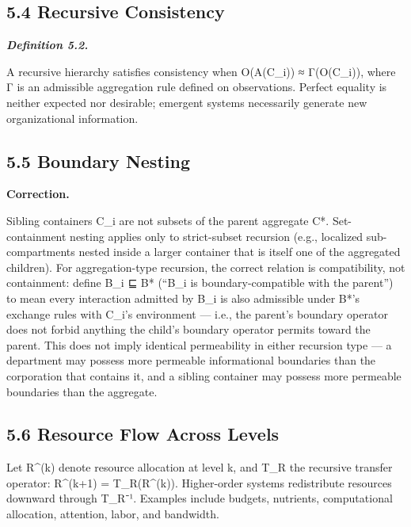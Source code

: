 \documentclass[
]{article}
\begin{document}
\hypertarget{recursive-consistency}{%
\subsection{5.4 Recursive Consistency}\label{recursive-consistency}}

\emph{\textbf{Definition 5.2.}}

A recursive hierarchy satisfies consistency when O(A(C\_i)) ≈
Γ(O(C\_i)), where Γ is an admissible aggregation rule defined on
observations. Perfect equality is neither expected nor desirable;
emergent systems necessarily generate new organizational information.

\hypertarget{boundary-nesting}{%
\subsection{5.5 Boundary Nesting}\label{boundary-nesting}}

\textbf{Correction.}

Sibling containers C\_i are not subsets of the parent aggregate C*.
Set-containment nesting applies only to strict-subset recursion (e.g.,
localized sub-compartments nested inside a larger container that is
itself one of the aggregated children). For aggregation-type recursion,
the correct relation is compatibility, not containment: define B\_i ⊑ B*
(``B\_i is boundary-compatible with the parent'') to mean every
interaction admitted by B\_i is also admissible under B*'s exchange
rules with C\_i's environment --- i.e., the parent's boundary operator
does not forbid anything the child's boundary operator permits toward
the parent. This does not imply identical permeability in either
recursion type --- a department may possess more permeable informational
boundaries than the corporation that contains it, and a sibling
container may possess more permeable boundaries than the aggregate.

\hypertarget{resource-flow-across-levels}{%
\subsection{5.6 Resource Flow Across
Levels}\label{resource-flow-across-levels}}

Let R\^{}(k) denote resource allocation at level k, and T\_R the
recursive transfer operator: R\^{}(k+1) = T\_R(R\^{}(k)). Higher-order
systems redistribute resources downward through T\_R⁻¹. Examples include
budgets, nutrients, computational allocation, attention, labor, and
bandwidth.
\end{document}

